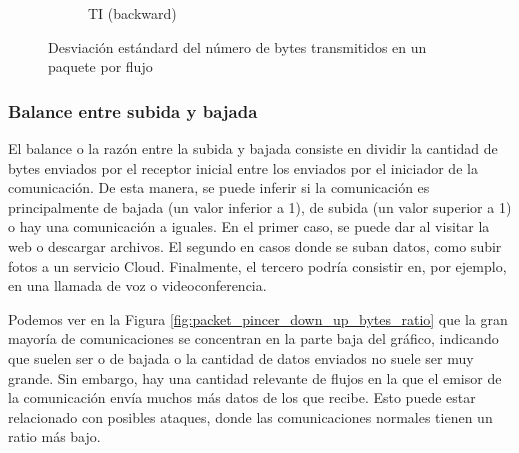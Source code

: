 \begin{figure}[H]
\begin{subfigure}[b]{0.26\textwidth}
        \caption{TI (backward)}
    \end{subfigure}
    \hfill
       \caption{Desviación estándard del número de bytes transmitidos en un paquete por flujo}
       \label{fig:packet_pincer_packet_bytes_std}
\end{figure}

\subsubsection{Balance entre subida y bajada}

El balance o la razón entre la subida y bajada consiste en dividir la cantidad de bytes enviados por el receptor inicial entre los enviados por el iniciador de la comunicación. De esta manera, se puede inferir si la comunicación es principalmente de bajada (un valor inferior a 1), de subida (un valor superior a 1) o hay una comunicación a iguales. En el primer caso, se puede dar al visitar la web o descargar archivos. El segundo en casos donde se suban datos, como subir fotos a un servicio Cloud. Finalmente, el tercero podría consistir en, por ejemplo, en una llamada de voz o videoconferencia. 

Podemos ver en la Figura \ref{fig:packet_pincer_down_up_bytes_ratio} que la gran mayoría de comunicaciones se concentran en la parte baja del gráfico, indicando que suelen ser o de bajada o la cantidad de datos enviados no suele ser muy grande. Sin embargo, hay una cantidad relevante de flujos en la que el emisor de la comunicación envía muchos más datos de los que recibe. Esto puede estar relacionado con posibles ataques, donde las comunicaciones normales tienen un ratio más bajo.

